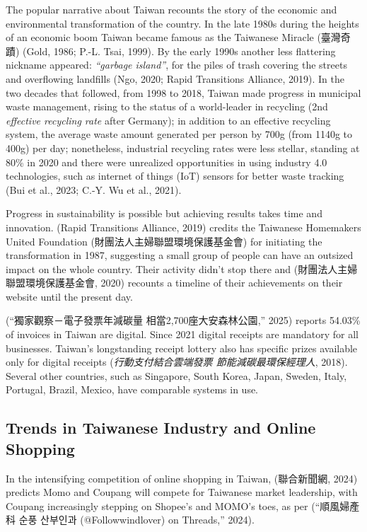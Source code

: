\documentclass[
  12pt,
  letterpaper,
  DIV=11,
  numbers=noendperiod]{scrartcl}
\begin{document}
The popular narrative about Taiwan recounts the story of the economic
and environmental transformation of the country. In the late 1980s
during the heights of an economic boom Taiwan became famous as the
Taiwanese Miracle (臺灣奇蹟) (Gold, 1986; P.-L. Tsai, 1999). By the
early 1990s another less flattering nickname appeared: \emph{``garbage
island''}, for the piles of trash covering the streets and overflowing
landfills (Ngo, 2020; Rapid Transitions Alliance, 2019). In the two
decades that followed, from 1998 to 2018, Taiwan made progress in
municipal waste management, rising to the status of a world-leader in
recycling (2nd \emph{effective recycling rate} after Germany); in
addition to an effective recycling system, the average waste amount
generated per person by 700g (from 1140g to 400g) per day; nonetheless,
industrial recycling rates were less stellar, standing at 80\% in 2020
and there were unrealized opportunities in using industry 4.0
technologies, such as internet of things (IoT) sensors for better waste
tracking (Bui et al., 2023; C.-Y. Wu et al., 2021).

Progress in sustainability is possible but achieving results takes time
and innovation. (Rapid Transitions Alliance, 2019) credits the Taiwanese
Homemakers United Foundation (財團法人主婦聯盟環境保護基金會) for
initiating the transformation in 1987, suggesting a small group of
people can have an outsized impact on the whole country. Their activity
didn't stop there and (財團法人主婦聯盟環境保護基金會, 2020) recounts a
timeline of their achievements on their website until the present day.

({``{獨家觀察－電子發票年減碳量 相當2,700座大安森林公園},''} 2025)
reports 54.03\% of invoices in Taiwan are digital. Since 2021 digital
receipts are mandatory for all businesses. Taiwan's longstanding receipt
lottery also has specific prizes available only for digital receipts
(\emph{行動支付結合雲端發票 節能減碳最環保{\textbar}經理人}, 2018).
Several other countries, such as Singapore, South Korea, Japan, Sweden,
Italy, Portugal, Brazil, Mexico, have comparable systems in use.

\subsection{Trends in Taiwanese Industry and Online
Shopping}\label{trends-in-taiwanese-industry-and-online-shopping}

In the intensifying competition of online shopping in Taiwan,
(聯合新聞網, 2024) predicts Momo and Coupang will compete for Taiwanese
market leadership, with Coupang increasingly stepping on Shopee's and
MOMO's toes, as per ({``順風婦產科 순풍 산부인과 (@Followwindlover) on
{Threads},''} 2024).
\end{document}
